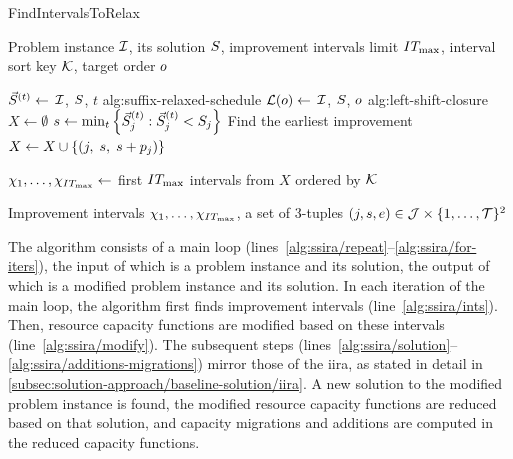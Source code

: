 \begin{algorithm}[t]
\caption{FindIntervalsToRelax}
\label{alg:find-intervals-to-relax}
\begin{algorithmic}[1]

\Input  Problem instance $\mathcal{I}$, its solution $S$, improvement intervals limit $IT_{\max}$,
\Inputc interval sort key $\mathcal{K}$, target order $o$

    $\vec{S}^{(t)} \gets$ %
                                        {$\mathcal{I}$, $S$, $t$}%
                                        {alg:suffix-relaxed-schedule}  \label{alg:ssira/ints/schedule-suffixes}
\EndFor
\State $\mathcal{L}(o) \gets$ %
                                              {$\mathcal{I}$, $S$, $o$}%
                                              {alg:left-shift-closure}  \label{alg:ssira/ints/closure}
\State $X \gets \emptyset$  \label{alg:ssira/ints/ints-init}
    \State $s \gets \min_t \left\{ \vec{S}^{(t)}_{j} : \vec{S}^{(t)}_{j} < S_{j} \right\}$  \label{alg:ssira/ints/ints-improvement}
        \Comment Find the earliest improvement
    \State $X \gets X \cup \left\{ (j,\; s,\; s + p_{j}) \right\}$  \label{alg:ssira/ints/ints-inclusion}
\EndFor

\State $\chi_1, \dots, \chi_{IT_{\max}} \gets$ first $IT_{\max}$ intervals from $X$ ordered by $\mathcal{K}$  \label{alg:ssira/ints/select-imp-ints}

\Output  Improvement intervals $\chi_1, \dots, \chi_{IT_{\max}}$,
\Outputc a set of 3-tuples $(j, s, e) \in \mathcal{J} \times \{{1}, \dots, {\mathcal{T}}\}^2$
\end{algorithmic}
\end{algorithm}


The algorithm consists of a main loop (lines~\ref{alg:ssira/repeat}--\ref{alg:ssira/for-iters}),
the input of which is a problem instance and its solution,
the output of which is a modified problem instance and its solution.
In each iteration of the main loop, the algorithm first finds improvement intervals (line~\ref{alg:ssira/ints}).
Then, resource capacity functions are modified based on these intervals (line~\ref{alg:ssira/modify}).
The subsequent steps (lines~\ref{alg:ssira/solution}--\ref{alg:ssira/additions-migrations}) mirror those of the \ac{iira},
as stated in detail in \cref{subsec:solution-approach/baseline-solution/iira}.
A new solution to the modified problem instance is found,
the modified resource capacity functions are reduced based on that solution,
and capacity migrations and additions are computed in the reduced capacity functions.


